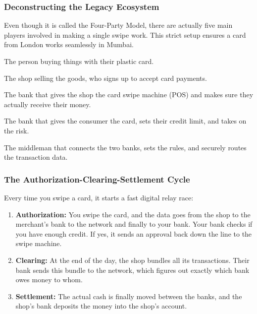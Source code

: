 \subsubsection{Deconstructing the Legacy Ecosystem}

Even though it is called the Four-Party Model, there are actually five main players involved in making a single swipe work. This strict setup ensures a card from London works seamlessly in Mumbai.

\begin{description}[style=nextline]
    \item[1. The Consumer:] The person buying things with their plastic card.
    \item[2. The Merchant:] The shop selling the goods, who signs up to accept card payments.
    \item[3. The Acquirer (Merchant's Bank):] The bank that gives the shop the card swipe machine (POS) and makes sure they actually receive their money.
    \item[4. The Issuer (Consumer's Bank):] The bank that gives the consumer the card, sets their credit limit, and takes on the risk.
    \item[5. The Network (Visa/Mastercard/RuPay):] The middleman that connects the two banks, sets the rules, and securely routes the transaction data.
\end{description}

\subsubsection{The Authorization-Clearing-Settlement Cycle}

Every time you swipe a card, it starts a fast digital relay race:

\begin{enumerate}
    \item \textbf{Authorization:} You swipe the card, and the data goes from the shop to the merchant's bank to the network and finally to your bank. Your bank checks if you have enough credit. If yes, it sends an approval back down the line to the swipe machine.
    \item \textbf{Clearing:} At the end of the day, the shop bundles all its transactions. Their bank sends this bundle to the network, which figures out exactly which bank owes money to whom.
    \item \textbf{Settlement:} The actual cash is finally moved between the banks, and the shop's bank deposits the money into the shop's account.
\end{enumerate}

